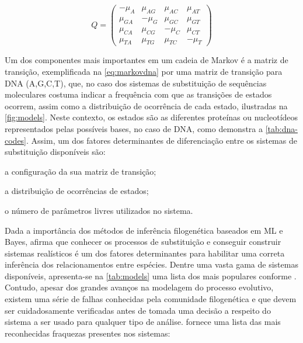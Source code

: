 \documentclass[english,brazilian]{UNISINOSmonografia} %
\begin{document}
\begin{equation}
\label{eq:markovdna}
Q = \begin{pmatrix}
-\mu_A & \mu_{AG} & \mu_{AC} & \mu_{AT} \\
\mu_{GA} & -\mu_G   & \mu_{GC} & \mu_{GT} \\
\mu_{CA} & \mu_{CG} & -\mu_C   & \mu_{CT} \\
\mu_{TA} & \mu_{TG} & \mu_{TC} & -\mu_T 
\end{pmatrix}
\end{equation}


Um dos componentes mais importantes em um cadeia de Markov é a matriz de transição, exemplificada na \autoref{eq:markovdna} por uma matriz de transição para DNA (A,G,C,T), que, no caso dos sistemas de substituição de sequências moleculares costuma indicar a frequência com que as transições de estados ocorrem, assim como a distribuição de ocorrência de cada estado, ilustradas na \autoref{fig:models}.
Neste contexto, os estados são as diferentes proteínas ou nucleotídeos representados pelas possíveis bases, no caso de DNA, como demonstra a \autoref{tab:dna-codes}.
Assim, um dos fatores determinantes de diferenciação entre os sistemas de substituição disponíveis são: 
\begin{inparaenum} 
	\item a configuração da sua matriz de transição;
	\item a distribuição de ocorrências de estados;
	\item o número de parâmetros livres utilizados no sistema.
\end{inparaenum}

%
%

Dada a importância dos métodos de inferência filogenética baseados em ML e Bayes,  afirma que conhecer os processos de substituição e conseguir construir sistemas realísticos é um dos fatores determinantes para habilitar uma correta inferência dos relacionamentos entre espécies.
Dentre uma vasta gama de sistemas disponíveis, apresenta-se na \autoref{tab:models} uma lista dos mais populares conforme .
Contudo, apesar dos grandes avanços na modelagem do processo evolutivo, existem uma série de falhas conhecidas pela comunidade filogenética e que devem ser cuidadosamente verificadas antes de tomada uma decisão a respeito do sistema a ser usado para qualquer tipo de análise.
 fornece uma lista das mais reconhecidas fraquezas presentes nos sistemas:
\end{document}

